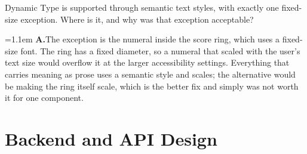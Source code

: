 \documentclass[11pt,a4paper]{article}
\newcommand{\ans}[1]{%
  \par\vspace{0.32em}%
  \begingroup
  \small\color{answerink}%
  \leftskip=1.1em
  \noindent\textbf{\color{accent}A.}\hspace{0.45em}#1\par
  \endgroup
  \vspace{0.1em}%
}
\begin{document}
\begin{questions}[resume]
\item Dynamic Type is supported through semantic text styles, with exactly one
fixed-size exception. Where is it, and why was that exception acceptable?
\ans{The exception is the numeral inside the score ring, which uses a fixed-size
font. The ring has a fixed diameter, so a numeral that scaled with the user's
text size would overflow it at the larger accessibility settings. Everything that
carries meaning as prose uses a semantic style and scales; the alternative would
be making the ring itself scale, which is the better fix and simply was not
worth it for one component.}

\end{questions}

\section{Backend and API Design}
\end{document}
